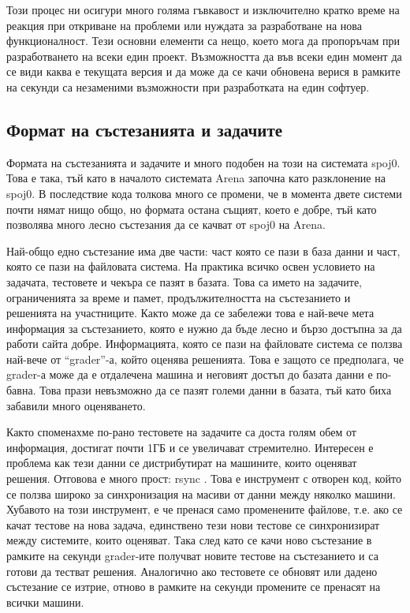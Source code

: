\documentclass[a4paper,12pt]{article}
\begin{document}
    Този процес ни осигури много голяма гъвкавост и изключително кратко време на реакция при откриване на проблеми или нуждата за разработване на нова функционалност. Тези основни елементи са нещо, което мога да пропоръчам при разработването на всеки един проект. Възможността да във всеки един момент да се види каква е текущата версия и да може да се качи обновена верися в рамките на секунди са незаменими възможности при разработката на един софтуер.
  \subsection{Формат на състезанията и задачите}                              
    Формата на състезанията и задачите и много подобен на този на системата spoj0. Това е така, тъй като в началото системата Arena започна като разклонение на spoj0. В последствие кода толкова много се промени, че в момента двете системи почти нямат нищо общо, но формата остана същият, което е добре, тъй като позволява много лесно състезания да се качват от spoj0 на Arena.
    
    Най-общо едно състезание има две части: част която се пази в база данни и част, която се пази на файловата система. На практика всичко освен условието на задачата, тестовете и чекъра се пазят в базата. Това са името на задачите, ограниченията за време и памет, продължителността на състезанието и решенията на участниците. Както може да се забележи това е най-вече мета информация за състезанието, която е нужно да бъде лесно и бързо достъпна за да работи сайта добре. Информацията, която се пази на файловате система се ползва най-вече от ``grader''-а, който оценява решенията. Това е защото се предполага, че grader-а може да е отдалечена машина и неговият достъп до базата данни е по-бавна. Това прази невъзможно да се пазят големи данни в базата, тъй като биха забавили много оценяването.
    
    Както споменахме по-рано тестовете на задачите са доста голям обем от информация, достигат почти 1ГБ и се увеличават стремително. Интересен е проблема как тези данни се дистрибутират на машините, които оценяват решения. Отговова е много прост: rsync \cite{rsync_site}. Това е инструмент с отворен код, който се ползва широко за синхронизация на масиви от данни между няколко машини. Хубавото на този инструмент, е че пренася само променените файлове, т.е. ако се качат тестове на нова задача, единствено тези нови тестове се синхронизират между системите, които оценяват. Така след като се качи ново състезание в рамките на секунди grader-ите получват новите тестове на състезанието и са готови да тестват решения. Аналогично ако тестовете се обновят или дадено състезание се изтрие, отново в рамките на секунди промените се пренасят на всички машини.
    
\end{document}
